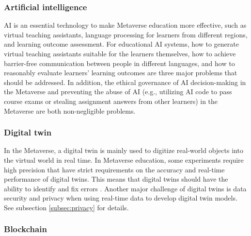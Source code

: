 \documentclass[conference]{IEEEtran}
\begin{document}
\subsubsection{Artificial intelligence}

AI \cite{merabet2021intelligent} is an essential technology to make Metaverse education more effective, such as virtual teaching assistants, language processing for learners from different regions, and learning outcome assessment. For educational AI systems, how to generate virtual teaching assistants suitable for the learners themselves, how to achieve barrier-free communication between people in different languages, and how to reasonably evaluate learners' learning outcomes are three major problems that should be addressed. In addition, the ethical governance of AI decision-making in the Metaverse and preventing the abuse of AI (e.g., utilizing AI code to pass course exams or stealing assignment answers from other learners) in the Metaverse are both non-negligible problems.

\subsubsection{Digital twin}

In the Metaverse, a digital twin \cite{jones2020characterising} is mainly used to digitize real-world objects into the virtual world in real time. In Metaverse education, some experiments require high precision that have strict requirements on the accuracy and real-time performance of digital twins. This means that digital twins should have the ability to identify and fix errors \cite{gadekallu2022blockchain}. Another major challenge of digital twins is data security and privacy when using real-time data to develop digital twin models. See subsection \ref{subsec:privacy} for details.

\subsubsection{Blockchain}
\end{document}
